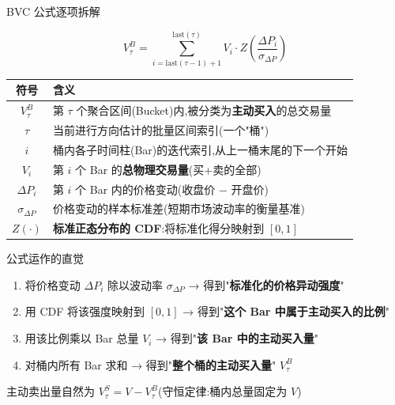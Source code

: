 \documentclass[10pt,aspectratio=169]{beamer}
\begin{document}
\begin{frame}{BVC 公式逐项拆解}

  \[
    V_\tau^B = \sum_{i = \text{last}(\tau-1)+1}^{\text{last}(\tau)} V_i \cdot Z\!\left(\frac{\Delta P_i}{\sigma_{\Delta P}}\right)
  \]

  \vfill

  \small
  \begin{tabular}{c|p{9.5cm}}
    \toprule
    \textbf{符号} & \textbf{含义} \\
    \midrule
    $V_\tau^B$ & 第 $\tau$ 个聚合区间(Bucket)内,被分类为\textbf{主动买入}的总交易量 \\
    $\tau$ & 当前进行方向估计的批量区间索引(一个"桶") \\
    $i$ & 桶内各子时间柱(Bar)的迭代索引,从上一桶末尾的下一个开始 \\
    $V_i$ & 第 $i$ 个 Bar 的\textbf{总物理交易量}(买+卖的全部) \\
    $\Delta P_i$ & 第 $i$ 个 Bar 内的价格变动(收盘价 $-$ 开盘价) \\
    $\sigma_{\Delta P}$ & 价格变动的样本标准差(短期市场波动率的衡量基准) \\
    $Z(\cdot)$ & \textbf{标准正态分布的 CDF}:将标准化得分映射到 $[0,1]$ \\
    \bottomrule
  \end{tabular}

  \vfill

  \begin{block}{公式运作的直觉}
    \begin{enumerate}
      \item 将价格变动 $\Delta P_i$ 除以波动率 $\sigma_{\Delta P}$ → 得到"\textbf{标准化的价格异动强度}"
      \item 用 CDF 将该强度映射到 $[0,1]$ → 得到"\textbf{这个 Bar 中属于主动买入的比例}"
      \item 用该比例乘以 Bar 总量 $V_i$ → 得到"\textbf{该 Bar 中的主动买入量}"
      \item 对桶内所有 Bar 求和 → 得到"\textbf{整个桶的主动买入量}" $V_\tau^B$
    \end{enumerate}
  \end{block}

  \vfill

  \centering\footnotesize
  主动卖出量自然为 $V_\tau^S = V - V_\tau^B$(守恒定律:桶内总量固定为 $V$)

\end{frame}
\end{document}
